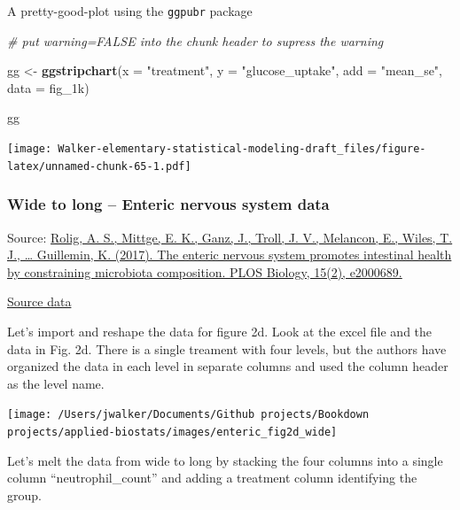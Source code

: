 \documentclass[]{book}
\newenvironment{Shaded}{\begin{snugshade}}{\end{snugshade}}
\newcommand{\CommentTok}[1]{\textcolor[rgb]{0.56,0.35,0.01}{\textit{#1}}}
\newcommand{\DataTypeTok}[1]{\textcolor[rgb]{0.13,0.29,0.53}{#1}}
\newcommand{\KeywordTok}[1]{\textcolor[rgb]{0.13,0.29,0.53}{\textbf{#1}}}
\newcommand{\NormalTok}[1]{#1}
\newcommand{\StringTok}[1]{\textcolor[rgb]{0.31,0.60,0.02}{#1}}
\begin{document}
A pretty-good-plot using the \texttt{ggpubr} package

\begin{Shaded}
\begin{Highlighting}[]
\CommentTok{# put warning=FALSE into the chunk header to supress the warning}

\NormalTok{gg <-}\StringTok{ }\KeywordTok{ggstripchart}\NormalTok{(}\DataTypeTok{x =} \StringTok{"treatment"}\NormalTok{,}
                   \DataTypeTok{y =} \StringTok{"glucose_uptake"}\NormalTok{,}
                   \DataTypeTok{add =} \StringTok{"mean_se"}\NormalTok{,}
                   \DataTypeTok{data =}\NormalTok{ fig_1k)}

\NormalTok{gg}
\end{Highlighting}
\end{Shaded}

\texttt{[image: Walker-elementary-statistical-modeling-draft\_files/figure-latex/unnamed-chunk-65-1.pdf]}

\hypertarget{wide-to-long-enteric-nervous-system-data}{%
\subsubsection{Wide to long -- Enteric nervous system data}\label{wide-to-long-enteric-nervous-system-data}}

Source: \href{https://doi.org/10.1371/journal.pbio.2000689}{Rolig, A. S., Mittge, E. K., Ganz, J., Troll, J. V., Melancon, E., Wiles, T. J., \ldots{} Guillemin, K. (2017). The enteric nervous system promotes intestinal health by constraining microbiota composition. PLOS Biology, 15(2), e2000689.}

\href{https://doi.org/10.1371/journal.pbio.2000689.s008}{Source data}

Let's import and reshape the data for figure 2d. Look at the excel file and the data in Fig. 2d. There is a single treament with four levels, but the authors have organized the data in each level in separate columns and used the column header as the level name.

\texttt{[image: /Users/jwalker/Documents/Github projects/Bookdown projects/applied-biostats/images/enteric\_fig2d\_wide]}

Let's melt the data from wide to long by stacking the four columns into a single column ``neutrophil\_count'' and adding a treatment column identifying the group.
\end{document}
